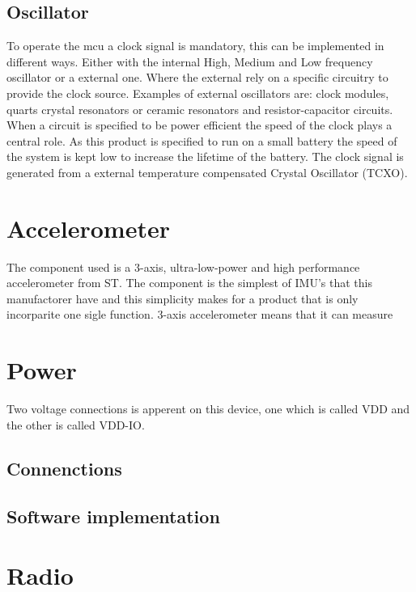 \subsection{Oscillator}
To operate the \gls{mcu} a clock signal is mandatory, this can be implemented in different ways. Either with the internal High, Medium and Low frequency oscillator or a external one. Where the external rely on a specific circuitry to provide the clock source. Examples of external oscillators are: clock modules, quarts crystal resonators or ceramic resonators and resistor-capacitor circuits. When a circuit is specified to be power efficient the speed of the clock plays a central role. As this product is specified to run on a small battery the speed of the system is kept low to increase the lifetime of the battery. The clock signal is generated from a external temperature compensated Crystal Oscillator (TCXO).



\newpage
\section{Accelerometer} %
The component used is a 3-axis, ultra-low-power and high performance accelerometer from ST\cite{STacc}. The component is the simplest of IMU's that this manufactorer have and this simplicity makes for a product that is only incorparite one sigle function. 3-axis accelerometer means that it can measure 

\section{Power}
Two voltage connections is apperent on this device, one which is called VDD and the other is called VDD-IO. 

\subsection{Connenctions}


\subsection{Software implementation}



\newpage
\section{Radio}


